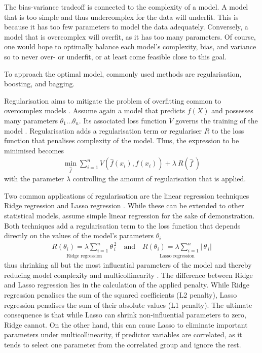 The bias-variance tradeoff is connected to the complexity of a model. A model 
that is too simple and thus undercomplex for the data will underfit. This is 
because it has too few parameters to model the data adequately. Conversely, a 
model that is overcomplex will overfit, as it has too many parameters. Of
course, one would hope to optimally balance each model's complexity, bias, and
variance so to never over- or underfit, or at least come feasible close to
this goal.

To approach the optimal model, commonly used methods are regularisation,
boosting, and bagging.
\bigbreak

\noindent Regularisation \label{mar:regularisation} 
aims to mitigate the problem of overfitting common to overcomplex models
\citep {Deisenroth2020}. Assume again a model that predicts $f\!\left(X\right)$
and possesses many parameters $\theta_1\dots\theta_n$. Its associated loss 
function $V$ governs the training of the model \citep{Rosasco2003}. 
Regularisation adds a regularisation term or regulariser $R$ to the loss 
function that penalises complexity of the model. Thus, the expression to be 
minimised becomes
\begin{align*}
  \min_{\widehat{f}}\sum_{i=1}^n
  V\!\left(\widehat{f}\!\left(x_i\right),f\!\left(x_i\right)\right)+
  \lambda\:R\!\left(\widehat{f}\:\right)
\end{align*}
with the parameter $\lambda$ controlling the amount of regularisation that is
applied.

Two common applications of regularisation are the linear regression techniques 
Ridge regression \citep{Hoerl1970} and Lasso regression \citep{Tibshirani1996}.
While these can be extended to other statistical models, assume simple linear
regression for the sake of demonstration. Both techniques add a regularisation
term to the loss function that depends directly on the values of the model's
parameters $\theta_i$
\begin{align*}
  \underset{\text{Ridge regression}}{
    R\left(\theta_{i}\right)=\lambda\sum_{i=1}^{n}\theta_{\,i}^{\,2}
  }
  \quad\text{and}\quad
  \underset{\text{Lasso regression}}{
    R\left(\theta_{i}\right)=\lambda\sum_{i=1}^{n}\left|\,\theta_{\,i}\right|
  }
\end{align*}
thus shrinking all but the most influential parameters of the model and 
thereby reducing model complexity and multicollinearity \citep{Herawati2018}. 
The difference between Ridge and Lasso regression lies in the calculation of 
the applied penalty. While Ridge regression penalises the sum of the squared 
coefficients (L2 penalty), Lasso regression penalises the sum of their 
absolute values (L1 penalty). The ultimate consequence is that while Lasso can 
shrink non-influential parameters to zero, Ridge cannot. On the other hand, 
this can cause Lasso to eliminate important parameters under 
multicollinearity, if predictor variables are correlated, as it tends to 
select one parameter from the correlated group and ignore the rest.

